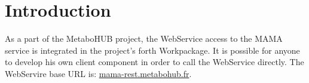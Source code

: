 


\graphicspath{ {mth_template/logos/} }

\usepackage{hyperref}


\usepackage{footnote}
\newcommand{\specialcell}[2][c]{%
  \begin{tabular}[#1]{@{}c@{}}#2\end{tabular}}











%

\section{Introduction}
\hspace*{\parindent}
As a part of the MetaboHUB project, 
the WebService access to the MAMA service is integrated in the project's forth Workpackage. 
It is possible for anyone to develop his own client component in order to call the WebService directly. 
The WebServire base URL is:  \href{https://mama-rest.metabohub.fr/}{mama-rest.metabohub.fr}. 
\newline

